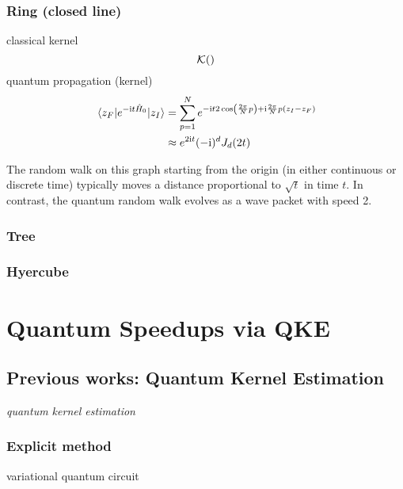 \subsubsection{Ring (closed line)}
classical kernel 
\begin{equation}
	\mathcal{K}()
\end{equation}
quantum propagation (kernel)
\begin{align}
	\mel{z_F}{e^{-\textup{i}t\hat{H}_0 }}{z_I}
	&=\sum_{p=1}^{N} 
	e^{-\textup{i} t 2\cos(\frac{2\pi}{N}p) +\textup{i} \frac{2\pi}{N} p(z_I-z_F)} 
	\\
	&
	\approx e^{2\textup{i} t} (-\textup{i})^{d} J_{d} (2t)
	\label{eq:ctqrw_kernel}
\end{align}
\begin{remark}
    The random walk on this graph starting from the origin (in either continuous or discrete time)
    typically moves a distance proportional to $\sqrt{t}$ in time $t$.
	In contrast, the quantum random walk evolves as a wave packet with speed 2.
\end{remark}

\subsubsection{Tree}
\subsubsection{Hyercube}

\section{Quantum Speedups via QKE}\label{sec:speedup}
\subsection{Previous works: Quantum Kernel Estimation}\label{sec:qke}
\emph{quantum kernel estimation}
\cite{schuldQuantumMachineLearning2019}
\cite{havlicekSupervisedLearningQuantum2019}

\subsubsection{Explicit method}
variational quantum circuit

